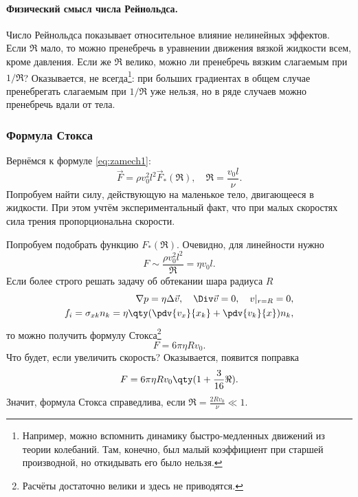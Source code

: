 \paragraph{Физический смысл числа Рейнольдса. } Число Рейнольдса показывает относительное влияние нелинейных эффектов.
Если $\Re$ мало, то можно пренебречь в уравнении движения вязкой жидкости всем, кроме давления. %
Если же $\Re$ велико, можно ли пренебречь вязким слагаемым при $1/\Re$? Оказывается, не всегда\footnote{Например, можно вспомнить динамику быстро-медленных движений из теории колебаний. Там, конечно, был малый коэффициент при старшей производной, но откидывать его было нельзя.}: при больших градиентах в общем случае пренебрегать слагаемым при $1/\Re$ уже нельзя, но в ряде случаев можно пренебречь вдали от тела.

\subsubsection{Формула Стокса}
Вернёмся к формуле \eqref{eq:zamech1}:
\begin{equation}
     \vec{F} = \rho v_0^2 l^2 \vec{F}_* (\Re), \quad \Re=\frac{v_0 l}{\nu}.
\end{equation}
Попробуем найти силу, действующую на маленькое тело, двигающееся в жидкости. При этом учтём экспериментальный факт, что при малых скоростях сила трения пропорциональна скорости.

Попробуем подобрать функцию $F_*(\Re)$. Очевидно, для линейности нужно
\begin{equation}
    F\sim \frac{\rho v_0^2 l^2}{\Re}=\eta v_0 l.
\end{equation}
Если более строго решать задачу об обтекании шара радиуса $R$
\begin{equation}
    \begin{aligned}
        \nabla p = \eta \Delta \vec{v}, \quad
        \Div \vec{v} = 0, \quad v|_{r=R}=0, \\
        f_i=\sigma_{xk} n_k = \eta \qty(\pdv{v_x}{x_k}+\pdv{v_k}{x})n_k,
    \end{aligned}
\end{equation}
то можно получить формулу Стокса\footnote{Расчёты достаточно велики и здесь не приводятся.}
\begin{equation}
    F=6\pi \eta R v_0.
\end{equation}
Что будет, если увеличить скорость? Оказывается, появится поправка
\begin{equation}
    F=6\pi \eta R v_0 \qty(1+\frac{3}{16}\Re).
\end{equation}
Значит, формула Стокса справедлива, если $\Re=\frac{2Rv_0}{\nu} \ll 1$.


